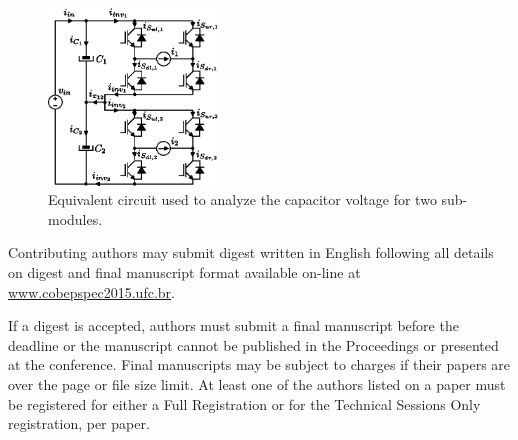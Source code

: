 \documentclass[letterpaper,oneside,onecolumn,draftclsnofoot,12pt,conference]{IEEEtran}
\begin{document}
\begin{figure} 
	\vspace{-20pt}
	\begin{center}
	\includegraphics[width=0.4\textwidth]{Figs/MHF1F_ix.eps}
	\caption{Equivalent circuit used to analyze the capacitor voltage for two sub-modules.}
	\label{fig:MHF1F_ix3}
	\end{center}
	\vspace{-20pt}
	\vspace{1pt}
\end{figure} 


Contributing authors may submit digest written in English following all details on digest and final manuscript format available on-line at \url{www.cobepspec2015.ufc.br}.



If a digest is accepted, authors must submit a final manuscript before the deadline or the manuscript cannot be published in the Proceedings or presented at the conference. Final manuscripts may be subject to charges if their papers are over the page or file size limit. At least one of the authors listed on a paper must be registered for either a Full Registration or for the Technical Sessions Only registration, per paper.




%
%
\end{document}
